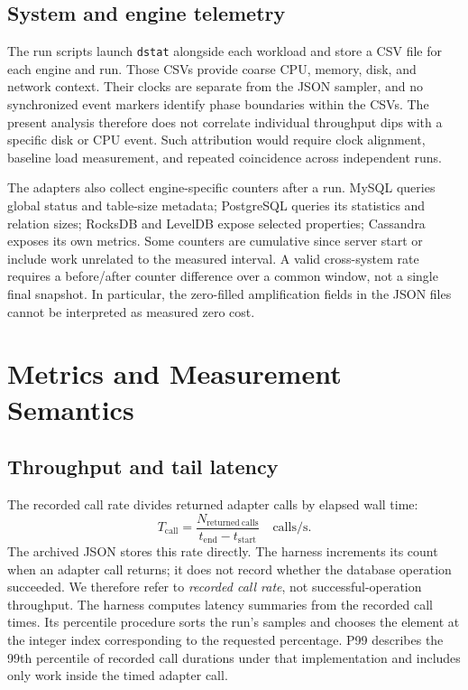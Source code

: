 \documentclass[10pt]{article}
\begin{document}
\subsection{System and engine telemetry}
The run scripts launch \texttt{dstat} alongside each workload and store a CSV file for each engine and run. Those CSVs provide coarse CPU, memory, disk, and network context. Their clocks are separate from the JSON sampler, and no synchronized event markers identify phase boundaries within the CSVs. The present analysis therefore does not correlate individual throughput dips with a specific disk or CPU event. Such attribution would require clock alignment, baseline load measurement, and repeated coincidence across independent runs.

The adapters also collect engine-specific counters after a run. MySQL queries global status and table-size metadata; PostgreSQL queries its statistics and relation sizes; RocksDB and LevelDB expose selected properties; Cassandra exposes its own metrics. Some counters are cumulative since server start or include work unrelated to the measured interval. A valid cross-system rate requires a before/after counter difference over a common window, not a single final snapshot. In particular, the zero-filled amplification fields in the JSON files cannot be interpreted as measured zero cost.

\section{Metrics and Measurement Semantics}
\label{sec:metrics}
\subsection{Throughput and tail latency}
The recorded call rate divides returned adapter calls by elapsed wall time:
\begin{equation}
T_{\mathrm{call}}=\frac{N_{\mathrm{returned\ calls}}}{t_{\mathrm{end}}-t_{\mathrm{start}}}\quad\mathrm{calls/s}.
\end{equation}
The archived JSON stores this rate directly. The harness increments its count when an adapter call returns; it does not record whether the database operation succeeded. We therefore refer to \emph{recorded call rate}, not successful-operation throughput. The harness computes latency summaries from the recorded call times. Its percentile procedure sorts the run's samples and chooses the element at the integer index corresponding to the requested percentage. P99 describes the 99th percentile of recorded call durations under that implementation and includes only work inside the timed adapter call.
\end{document}
